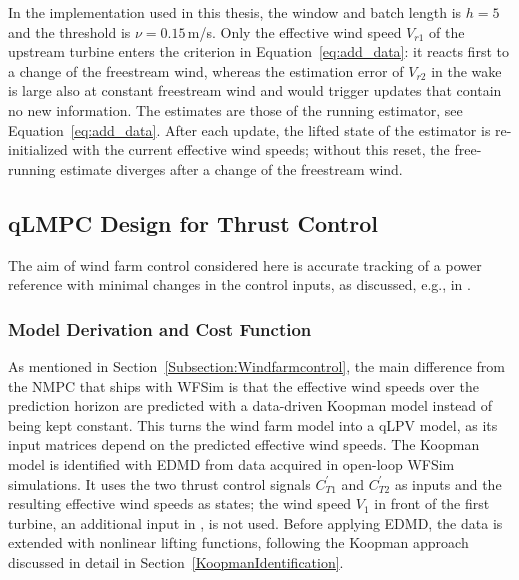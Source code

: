In the implementation used in this thesis, the window and batch length is $h = 5$ and the threshold is $\nu = 0.15$\,m/s. Only the effective wind speed $V_{r1}$ of the upstream turbine enters the criterion in Equation~\eqref{eq:add_data}: it reacts first to a change of the freestream wind, whereas the estimation error of $V_{r2}$ in the wake is large also at constant freestream wind and would trigger updates that contain no new information. The estimates are those of the running estimator, see Equation~\eqref{eq:add_data}. After each update, the lifted state of the estimator is re-initialized with the current effective wind speeds; without this reset, the free-running estimate diverges after a change of the freestream wind.
\subsection{qLMPC Design for Thrust Control} 
The aim of wind farm control considered here is accurate tracking of a power reference with minimal changes in the control inputs, as discussed, e.g., in \cite{vali2019adjoint, boersma2019constrained}.
\subsubsection{Model Derivation and Cost Function}
As mentioned in Section~\ref{Subsection:Windfarmcontrol}, the main difference from the NMPC that ships with WFSim is that the effective wind speeds over the prediction horizon are predicted with a data-driven Koopman model instead of being kept constant. This turns the wind farm model into a qLPV model, as its input matrices depend on the predicted effective wind speeds. The Koopman model is identified with EDMD from data acquired in open-loop WFSim simulations. It uses the two thrust control signals $C_{T1}^{\prime}$ and $C_{T2}^{\prime}$ as inputs and the resulting effective wind speeds as states; the wind speed $V_1$ in front of the first turbine, an additional input in \cite{dittmer2022data}, is not used. Before applying EDMD, the data is extended with nonlinear lifting functions, following the Koopman approach discussed in detail in Section~\ref{KoopmanIdentification}.


